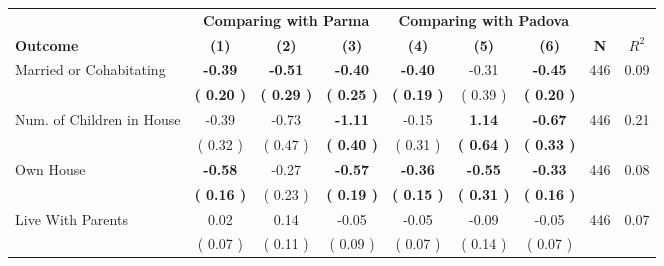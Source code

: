 \begin{tabular}{lcccccccc}
\toprule
 & \multicolumn{3}{c}{\textbf{Comparing with Parma}} & \multicolumn{3}{c}{\textbf{Comparing with Padova}} & \\
\cmidrule(lr){2-4} \cmidrule(lr){5-7} 
 \textbf{Outcome} & \textbf{(1)} & \textbf{(2)} & \textbf{(3)} & \textbf{(4)} & \textbf{(5)} & \textbf{(6)} & \textbf{N} & \textbf{$ R^2$} \\
\midrule
Married or Cohabitating & \textbf{    -0.39} & \textbf{    -0.51} & \textbf{    -0.40} & \textbf{    -0.40} &     -0.31 & \textbf{    -0.45} & 446 &       0.09 \\ 
 & \textbf{(     0.20 )} & \textbf{(     0.29 )} & \textbf{(     0.25 )} & \textbf{(     0.19 )} & (     0.39 ) & \textbf{(     0.20 )} & \\
Num. of Children in House &     -0.39 &     -0.73 & \textbf{    -1.11} &     -0.15 & \textbf{     1.14} & \textbf{    -0.67} & 446 &       0.21 \\ 
 & (     0.32 ) & (     0.47 ) & \textbf{(     0.40 )} & (     0.31 ) & \textbf{(     0.64 )} & \textbf{(     0.33 )} & \\
Own House & \textbf{    -0.58} &     -0.27 & \textbf{    -0.57} & \textbf{    -0.36} & \textbf{    -0.55} & \textbf{    -0.33} & 446 &       0.08 \\ 
 & \textbf{(     0.16 )} & (     0.23 ) & \textbf{(     0.19 )} & \textbf{(     0.15 )} & \textbf{(     0.31 )} & \textbf{(     0.16 )} & \\
Live With Parents &      0.02 &      0.14 &     -0.05 &     -0.05 &     -0.09 &     -0.05 & 446 &       0.07 \\ 
 & (     0.07 ) & (     0.11 ) & (     0.09 ) & (     0.07 ) & (     0.14 ) & (     0.07 ) & \\
\bottomrule
\end{tabular}
